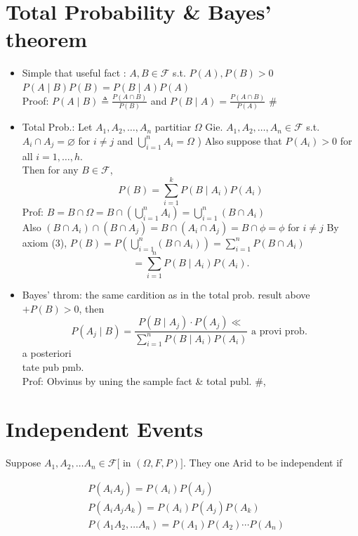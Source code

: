 \documentclass[10pt]{article}
\begin{document}
\section*{Total Probability \& Bayes' theorem}
\begin{itemize}
  \item[-] Simple that useful fact : \(A, B \in \mathcal{F}\) s.t. \(P(A), P(B)>0\) \(P(A \mid B) P(B)=P(B \mid A) P(A)\)\\
Proof: \(P(A \mid B) \triangleq \frac{P(A \cap B)}{P(B)}\) and \(P(B \mid A)=\frac{P(A \cap B)}{P(A)}\) \#
  \item[-] Total Prob.: Let \(A_{1}, A_{2}, \ldots, A_{n}\) partitiar \(\Omega\) Gie. \(A_{1}, A_{2}, \ldots, A_{n} \in \mathcal{F}\) s.t. \(A_{i} \cap A_{j}=\varnothing\) for \(i \neq j\) and \(\bigcup_{i=1}^{n} A_{i}=\Omega\) ) Also suppose that \(P\left(A_{i}\right)>0\) for all \(i=1, \ldots, h\).\\
Then for any \(B \in \mathcal{F}\),
\[
P(B)=\sum_{i=1}^{k} P\left(B \mid A_{i}\right) P\left(A_{i}\right)
\]
Prof: \(B=B \cap \Omega=B \cap\left(\bigcup_{i=1}^{n} A_{i}\right)=\bigcup_{i=1}^{n}\left(B \cap A_{i}\right)\)\\
Also \(\left(B \cap A_{i}\right) \cap\left(B \cap A_{j}\right)=B \cap\left(A_{i} \cap A_{j}\right)=B \cap \phi=\phi\) for \(i \neq j\) By axiom (3), \(P(B)=P\left(\bigcup_{i=1}^{n}\left(B \cap A_{i}\right)\right)=\sum_{i=1}^{n} P\left(B \cap A_{i}\right)\)
\[
=\sum_{i=1}^{n} P\left(B \mid A_{i}\right) P\left(A_{i}\right) .
\]
  \item[-] Bayes' throm: the same cardition as in the total prob. result above \(+P(B)>0\), then
\[
P\left(A_{j} \mid B\right)=\frac{P\left(B \mid A_{j}\right) \cdot P\left(A_{j}\right) \ll}{\sum_{i=1}^{n} P\left(B \mid A_{i}\right) P\left(A_{i}\right)} \text { a provi prob. }
\]
a posteriori\\
tate pub pmb.\\
Prof: Obvinus by uning the sample fact \& total publ. \#,
\end{itemize}

\section*{Independent Events}
Suppose \(A_{1}, A_{2}, \ldots A_{n} \in \mathcal{F}[\) in \((\Omega, F, P)]\). They one Arid to be independent if

\[
\begin{aligned}
& P\left(A_{i} A_{j}\right)=P\left(A_{i}\right) P\left(A_{j}\right) \\
& P\left(A_{i} A_{j} A_{k}\right)=P\left(A_{i}\right) P\left(A_{j}\right) P\left(A_{k}\right) \\
& P\left(A_{1} A_{2}, \ldots A_{n}\right)=P\left(A_{1}\right) P\left(A_{2}\right) \cdots P\left(A_{n}\right)
\end{aligned}
\]
\end{document}
